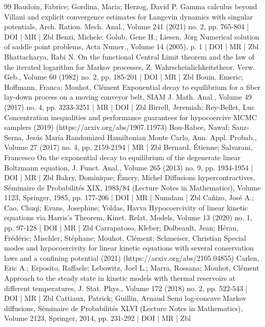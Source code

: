 \documentclass[10pt]{amsart}
\theoremstyle{definition}\newtheorem{defi}[theo]{Definition}\newtheorem{rema}[theo]{Remark}\newtheorem{exam}[theo]{Example}\newtheorem{exem}[theo]{Example}\newtheorem{nota}[theo]{Notation}
\begin{document}
\begin{thebibliography}{99}
Baudoin, Fabrice; Gordina, Maria; Herzog, David P. Gamma calculus beyond Villani and explicit convergence estimates for Langevin dynamics with singular potentials, Arch. Ration. Mech. Anal., Volume 241 (2021) no. 2, pp. 765-804 | DOI | MR | Zbl
Benzi, Michele; Golub, Gene H.; Liesen, Jörg Numerical solution of saddle point problems, Acta Numer., Volume 14 (2005), p. 1 | DOI | MR | Zbl
Bhattacharya, Rabi N. On the functional Central Limit theorem and the law of the iterated logarithm for Markov processes, Z. Wahrscheinlichkeitstheor. Verw. Geb., Volume 60 (1982) no. 2, pp. 185-201 | DOI | MR | Zbl
Bouin, Emeric; Hoffmann, Franca; Mouhot, Clément Exponential decay to equilibrium for a fiber lay-down process on a moving conveyor belt, SIAM J. Math. Anal., Volume 49 (2017) no. 4, pp. 3233-3251 | MR | DOI | Zbl
Birrell, Jeremiah; Rey-Bellet, Luc Concentration inequalities and performance guarantees for hypocoercive MCMC samplers (2019) (https://arxiv.org/abs/1907.11973)
Bou-Rabee, Nawaf; Sanz-Serna, Jesús María Randomized Hamiltonian Monte Carlo, Ann. Appl. Probab., Volume 27 (2017) no. 4, pp. 2159-2194 | MR | Zbl
Bernard, Étienne; Salvarani, Francesco On the exponential decay to equilibrium of the degenerate linear Boltzmann equation, J. Funct. Anal., Volume 265 (2013) no. 9, pp. 1934-1954 | DOI | MR | Zbl
Bakry, Dominique; Émery, Michel Diffusions hypercontractives, Séminaire de Probabilités XIX, 1983/84 (Lecture Notes in Mathematics), Volume 1123, Springer, 1985, pp. 177-206 | DOI | MR | Numdam | Zbl
Cañizo, José A.; Cao, Chuqi; Evans, Josephine; Yoldas, Havva Hypocoercivity of linear kinetic equations via Harris’s Theorem, Kinet. Relat. Models, Volume 13 (2020) no. 1, pp. 97-128 | DOI | MR | Zbl
Carrapatoso, Kleber; Dolbeault, Jean; Hérau, Frédéric; Mischler, Stéphane; Mouhot, Clément; Schmeiser, Christian Special modes and hypocoercivity for linear kinetic equations with several conservation laws and a confining potential (2021) (https://arxiv.org/abs/2105.04855)
Carlen, Eric A.; Esposito, Raffaele; Lebowitz, Joel L.; Marra, Rossana; Mouhot, Clément Approach to the steady state in kinetic models with thermal reservoirs at different temperatures, J. Stat. Phys., Volume 172 (2018) no. 2, pp. 522-543 | DOI | MR | Zbl
Cattiaux, Patrick; Guillin, Arnaud Semi log-concave Markov diffusions, Séminaire de Probabilités XLVI (Lecture Notes in Mathematics), Volume 2123, Springer, 2014, pp. 231-292 | DOI | MR | Zbl

\end{thebibliography}
\end{document}

